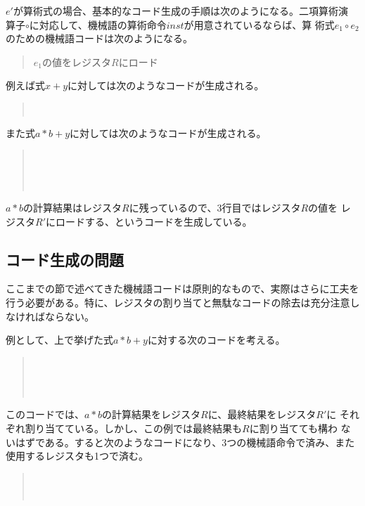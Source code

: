 $e'$が算術式の場合、基本的なコード生成の手順は次のようになる。二項算術演
算子$\circ$に対応して、機械語の算術命令$inst$が用意されているならば、算
術式$e_1 \circ e_2$のための機械語コードは次のようになる。
\begin{quote}
 $e_1$の値をレジスタ$R$にロード \\
\end{quote}
例えば式$x+y$に対しては次のようなコードが生成される。
\begin{quote}
  \\
\end{quote}
また式$a*b+y$に対しては次のようなコードが生成される。
\begin{quote}
  \\
  \\
  \\
\end{quote}
$a*b$の計算結果はレジスタ$R$に残っているので、3行目ではレジスタ$R$の値を
レジスタ$R'$にロードする、というコードを生成している。

\subsection{コード生成の問題}

ここまでの節で述べてきた機械語コードは原則的なもので、実際はさらに工夫を
行う必要がある。特に、レジスタの割り当てと無駄なコードの除去は充分注意し
なければならない。

例として、上で挙げた式$a*b+y$に対する次のコードを考える。
\begin{quote}
  \\
  \\
  \\
\end{quote}
このコードでは、$a*b$の計算結果をレジスタ$R$に、最終結果をレジスタ$R'$に
それぞれ割り当てている。しかし、この例では最終結果も$R$に割り当てても構わ
ないはずである。すると次のようなコードになり、3つの機械語命令で済み、また
使用するレジスタも1つで済む。
\begin{quote}
  \\
  \\
\end{quote}

